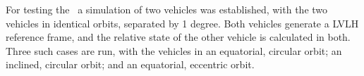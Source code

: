 %
%
% 
%



 For testing the \LVLHDesc\, a simulation of two vehicles was established, with the two vehicles in identical orbits, separated by 1 degree. Both vehicles generate a LVLH reference frame, and the relative state of the other vehicle is calculated in both.  Three such cases are run, with the vehicles in an equatorial, circular orbit; an inclined, circular orbit; and an equatorial, eccentric orbit.

\label{test:LVLH}


